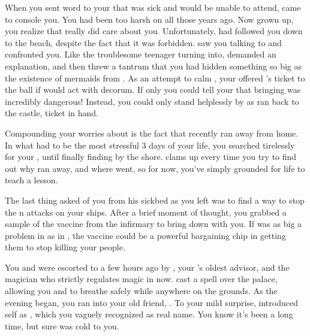 \documentclass[char]{NeptuneBall}
\begin{document}
When you sent word to your \cKing{\parent} that \cEric{} was sick and would be unable to attend, \cKing{} came to console you. You had been too harsh on \cKing{\them} all those years ago. Now grown up, you realize that \cKing{} really did care about you. Unfortunately, \cWillow{} had followed you down to the beach, despite the fact that it was forbidden. \cWillow{\They} saw you talking to \cKing{} and confronted you. Like the troublesome teenager \cWillow{\they} \cWillow{\were} turning into, \cWillow{} demanded an explanation, and then threw a tantrum that you had hidden something so big as the existence of mermaids from \cWillow{\them}. As an attempt to calm \cWillow{}, your \cKing{\parent} offered \cWillow{\them} \cEric{}'s ticket to the ball if \cWillow{\they} would act with decorum. If only you could tell your \cKing{\parent} that bringing \cWillow{} was incredibly dangerous! Instead, you could only stand helplessly by as \cWillow{} ran back to the castle, ticket in hand.

Compounding your worries about \cWillow{} is the fact that \cWillow{\they} recently ran away from home. In what had to be the most stressful 3 days of your life, you searched tirelessly for your \cWillow{\offspring}, until finally finding \cWillow{\them} by the shore. \cWillow{} clams up every time you try to find out why \cWillow{\they} ran away, and where \cWillow{\they} went, so for now, you've simply grounded \cWillow{\them} for life to teach \cWillow{\them} a lesson.

The last thing \cEric{} asked of you from his sickbed as you left was to find a way to stop the \pPacifica{}n attacks on your ships. After a brief moment of thought, you grabbed a sample of the \cPolio{} vaccine from the infirmary to bring down with you. If \cPolio{} was as big a problem in \pPacifica{} as in \pAtlantis{}, the \cPolio{} vaccine could be a powerful bargaining chip in getting them to stop killing your people. 

You and \cWillow{} were escorted to \pAtlantis{} a few hours ago by \cManta{}, your \cKing{\parent}'s oldest advisor, and the magician who strictly regulates magic in \pAtlantis{} now. \cManta{} cast a spell over the palace, allowing you and \cWillow{} to breathe safely while anywhere on the grounds. As the evening began, you ran into your old friend, \cPriest{}. To your mild surprise, \cPriest{\they} introduced \cPriest{\them}self as \cPriest{\MYname}, which you vaguely recognized as \cPriest{\their} real name. You know it's been a long time, but \cPriest{} sure was cold to you.
\end{document}
